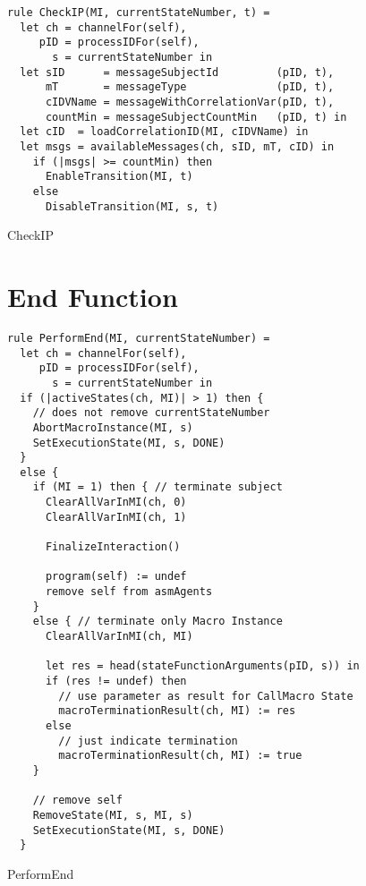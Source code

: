 \begin{listing}[H]
\begin{verbatim}
rule CheckIP(MI, currentStateNumber, t) =
  let ch = channelFor(self),
     pID = processIDFor(self),
       s = currentStateNumber in
  let sID      = messageSubjectId         (pID, t),
      mT       = messageType              (pID, t),
      cIDVName = messageWithCorrelationVar(pID, t),
      countMin = messageSubjectCountMin   (pID, t) in
  let cID  = loadCorrelationID(MI, cIDVName) in
  let msgs = availableMessages(ch, sID, mT, cID) in
    if (|msgs| >= countMin) then
      EnableTransition(MI, t)
    else
      DisableTransition(MI, s, t)
\end{verbatim}
\caption{CheckIP}
\label{lst:asm:CheckIP}
\end{listing}





\section{End Function}

\begin{listing}[H]
\begin{verbatim}
rule PerformEnd(MI, currentStateNumber) =
  let ch = channelFor(self),
     pID = processIDFor(self),
       s = currentStateNumber in
  if (|activeStates(ch, MI)| > 1) then {
    // does not remove currentStateNumber
    AbortMacroInstance(MI, s)
    SetExecutionState(MI, s, DONE)
  }
  else {
    if (MI = 1) then { // terminate subject
      ClearAllVarInMI(ch, 0)
      ClearAllVarInMI(ch, 1)

      FinalizeInteraction()

      program(self) := undef
      remove self from asmAgents
    }
    else { // terminate only Macro Instance
      ClearAllVarInMI(ch, MI)

      let res = head(stateFunctionArguments(pID, s)) in
      if (res != undef) then
        // use parameter as result for CallMacro State
        macroTerminationResult(ch, MI) := res
      else
        // just indicate termination
        macroTerminationResult(ch, MI) := true
    }

    // remove self
    RemoveState(MI, s, MI, s)
    SetExecutionState(MI, s, DONE)
  }
\end{verbatim}
\caption{PerformEnd}
\label{lst:asm:PerformEnd}
\end{listing}



